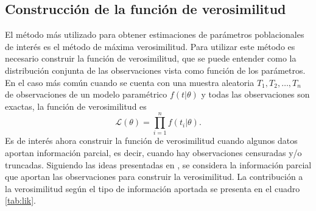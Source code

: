 \documentclass[11pt,a4paper]{article}
\begin{document}
\subsection{Construcción de la función de verosimilitud}
\label{sec:ver}

El método más utilizado para obtener estimaciones de parámetros poblacionales de interés es el método de máxima verosimilitud. Para utilizar este método es necesario construir la función de verosimilitud, que se puede entender como la distribución conjunta de las observaciones vista como función de los parámetros. En el caso más común cuando se cuenta con una muestra aleatoria $T_1, T_2, \dots, T_n$ de observaciones de un modelo paramétrico $f(t|\theta)$ y todas las observaciones son exactas, la función de verosimilitud es $$\mathcal{L}(\theta) = \prod_{i = 1}^n f(t_i|\theta).$$ Es de interés ahora construir la función de verosimilitud cuando algunos datos aportan información parcial, es decir, cuando hay observaciones censuradas y/o truncadas. Siguiendo las ideas presentadas en \citet{klein}, se considera la información parcial que aportan las observaciones para construir la verosimilitud. La contribución a la verosimilitud según el tipo de información aportada se presenta en el cuadro \ref{tab:lik}.

\begin{table}[ht]
\begin{center}
\end{center}
\caption{Contribución de las observaciones a la función de verosimilitud.}
\label{tab:lik}
\end{table}
\end{document}
